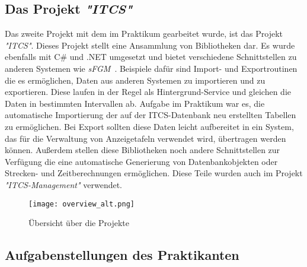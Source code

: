 \subsection{Das Projekt \emph{"ITCS"}}\label{sec:itcs}
    Das zweite Projekt mit dem im Praktikum gearbeitet wurde, ist das Projekt \emph{"ITCS"}. Dieses Projekt stellt eine Ansammlung von Bibliotheken dar.
    Es wurde ebenfalls mit C\# und .NET umgesetzt und bietet verschiedene Schnittstellen zu anderen Systemen wie \emph{sFGM}~\cite{sFGM}.
    Beispiele dafür sind Import- und Exportroutinen die es ermöglichen, Daten aus anderen Systemen zu importieren und zu exportieren. Diese laufen in der Regel als Hintergrund-Service und gleichen die Daten in
    bestimmten Intervallen ab. Aufgabe im Praktikum war es, die automatische 
    Importierung der auf der ITCS-Datenbank neu erstellten Tabellen zu ermöglichen. Bei Export sollten diese Daten leicht aufbereitet in ein System, das für die Verwaltung von 
    Anzeigetafeln verwendet wird, übertragen werden können. Außerdem stellen diese Bibliotheken noch andere Schnittstellen zur Verfügung die eine automatische Generierung
    von Datenbankobjekten oder Strecken- und Zeitberechnungen ermöglichen. Diese Teile wurden auch im Projekt \emph{"ITCS-Management"} verwendet.
    \begin{figure}[H]
        \centering
        \texttt{[image: overview\_alt.png]}
        \caption{Übersicht über die Projekte}
        \label{fig:VTs}
    \end{figure}

\subsection{Aufgabenstellungen des Praktikanten}\label{sec:aufgabenstellung-praktikant}

